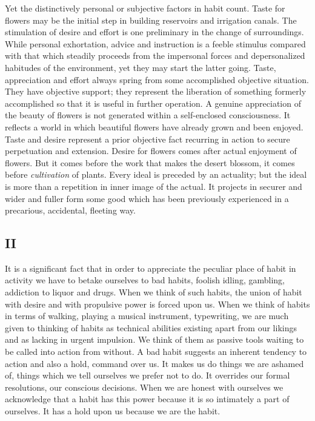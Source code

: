 \documentclass[12pt]{article}
\begin{document}
Yet the distinctively personal or subjective factors in
habit count. Taste for flowers may be the initial step
in building reservoirs and irrigation canals. The stimulation
of desire and effort is one preliminary in the
change of surroundings. While personal exhortation,
advice and instruction is a feeble stimulus compared
with that which steadily proceeds from the impersonal
forces and depersonalized habitudes of the environment,
yet they may start the latter going. Taste, appreciation
and effort always spring from some accomplished
objective situation. They have objective
support; they represent the liberation of something
formerly accomplished so that it is useful in further
operation. A genuine appreciation of the beauty of
flowers is not generated within a self-enclosed consciousness.
It reflects a world in which beautiful flowers have
already grown and been enjoyed. Taste and desire
represent a prior objective fact recurring in action to
secure perpetuation and extension. Desire for flowers
comes after actual enjoyment of flowers. But it comes
before the work that makes the desert blossom, it comes
before \emph{cultivation} of plants. Every ideal is preceded by
an actuality; but the ideal is more than a repetition
in inner image of the actual. It projects in securer and
wider and fuller form some good which has been previously
experienced in a precarious, accidental, fleeting
way.


\subsection*{II}

It is a significant fact that in order to appreciate
the peculiar place of habit in activity we have to betake
ourselves to bad habits, foolish idling, gambling,
addiction to liquor and drugs. When we think of such
habits, the union of habit with desire and with propulsive
power is forced upon us. When we think of
habits in terms of walking, playing a musical instrument,
typewriting, we are much given to thinking of
habits as technical abilities existing apart from our
likings and as lacking in urgent impulsion. We think
of them as passive tools waiting to be called into action
from without. A bad habit suggests an inherent tendency
to action and also a hold, command over us. It
makes us do things we are ashamed of, things which we
tell ourselves we prefer not to do. It overrides our
formal resolutions, our conscious decisions. When we
are honest with ourselves we acknowledge that a habit
has this power because it is so intimately a part of ourselves.
It has a hold upon us because we are the habit.
\end{document}
